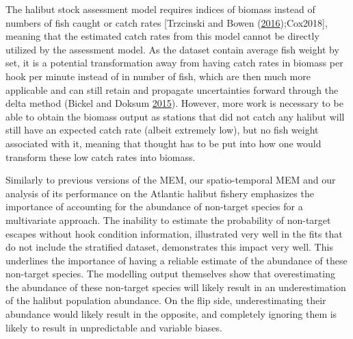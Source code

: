 \documentclass[12pt]{article}\usepackage[]{graphicx}\usepackage[]{color}
\begin{document}
The halibut stock assessment model requires indices of biomass instead of numbers of fish caught or catch rates {[}Trzcinski and Bowen (\protect\hyperlink{ref-Trzcinski2016}{2016});Cox2018{]}, meaning that the estimated catch rates from this model cannot be directly utilized by the assessment model. As the dataset contain average fish weight by set, it is a potential transformation away from having catch rates in biomass per hook per minute instead of in number of fish, which are then much more applicable and can still retain and propagate uncertainties forward through the delta method (Bickel and Doksum \protect\hyperlink{ref-Bickel2015}{2015}). However, more work is necessary to be able to obtain the biomass output as stations that did not catch any halibut will still have an expected catch rate (albeit extremely low), but no fish weight associated with it, meaning that thought has to be put into how one would transform these low catch rates into biomass.

Similarly to previous versions of the MEM, our spatio-temporal MEM and our analysis of its performance on the Atlantic halibut fishery emphasizes the importance of accounting for the abundance of non-target species for a multivariate approach. The inability to estimate the probability of non-target escapes without hook condition information, illustrated very well in the fits that do not include the stratified dataset, demonstrates this impact very well. This underlines the importance of having a reliable estimate of the abundance of these non-target species. The modelling output themselves show that overestimating the abundance of these non-target species will likely result in an underestimation of the halibut population abundance. On the flip side, underestimating their abundance would likely result in the opposite, and completely ignoring them is likely to result in unpredictable and variable biases.
\end{document}
